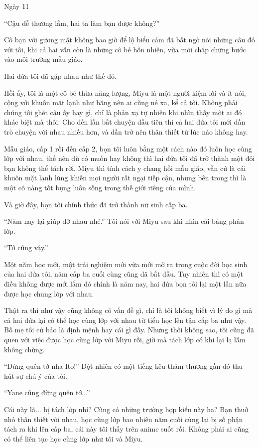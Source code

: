 {Ngày 11}
{

``Cậu dễ thương lắm, hai ta làm bạn được không?''

Cô bạn với gương mặt không bao giờ để lộ biểu cảm đã bất ngờ nói những
câu đó với tôi, khi cả hai vẫn còn là những cô bé hồn nhiên, vừa mới
chập chững bước vào môi trường mẫu giáo.

Hai đứa tôi đã gặp nhau như thế đó.

Hồi ấy, tôi là một cô bé thừa năng lượng, Miyu là một người kiệm lời và
ít nói, cộng với khuôn mặt lạnh như băng nên ai cũng né xa, kể cả tôi.
Không phải chúng tôi ghét cậu ấy hay gì, chỉ là phản xạ tự nhiên khi
nhìn thấy một ai đó khác biệt mà thôi. Cho đến lần bắt chuyện đầu tiên
thì cả hai đứa tôi mới dần trò chuyện với nhau nhiều hơn, và dần trở nên
thân thiết từ lúc nào không hay.

Mẫu giáo, cấp 1 rồi đến cấp 2, bọn tôi luôn bằng một cách nào đó luôn
học cùng lớp với nhau, thế nên dù có muốn hay không thì hai đứa tôi đã
trở thành một đôi bạn không thể tách rời. Miyu thì tính cách y chang hồi
mẫu giáo, vẫn cứ là cái khuôn mặt lạnh lùng khiến mọi người rất ngại
tiếp cận, nhưng bên trong thì là một cô nàng tốt bụng luôn sống trong
thế giới riêng của mình.

Và giờ đây, bọn tôi chính thức đã trở thành nữ sinh cấp ba.

``Năm nay lại giúp đỡ nhau nhé.'' Tôi nói với Miyu sau khi nhìn cái bảng
phân lớp.

``Tớ cũng vậy.''

Một năm học mới, một trải nghiệm mới vừa mới mở ra trong cuộc đời học
sinh của hai đứa tôi, năm cấp ba cuối cùng cũng đã bắt đầu. Tuy nhiên
thì có một điều không được mới lắm đó chính là năm nay, hai đứa bọn tôi
lại một lần nữa được học chung lớp với nhau.

Thật ra thì như vậy cũng không có vấn đề gì, chỉ là tôi không biết vì lý
do gì mà cả hai đứa lại có thể học cùng lớp với nhau từ tiểu học lên tận
cấp ba như vậy. Bố mẹ tôi cứ bảo là định mệnh hay cái gì đấy. Nhưng thôi
không sao, tôi cũng đã quen với việc được học cùng lớp với Miyu rồi, giờ
mà tách lớp có khi lại lạ lẫm không chừng.

``Đừng quên tớ nha Ito!'' Đột nhiên có một tiếng kêu thảm thương gần đó
thu hút sự chú ý của tôi.

``Yane cũng đừng quên tớ...''

Cái này là... bị tách lớp nhỉ? Cũng có những trường hợp kiểu này ha? Bạn
thuở nhỏ thân thiết với nhau, học cùng lớp bao nhiêu năm cuối cùng lại
bị số phận tách ra khi lên cấp ba, cái này tôi thấy trên anime suốt rồi.
Không phải ai cũng có thể liên tục học cùng lớp như tôi và Miyu.

}
